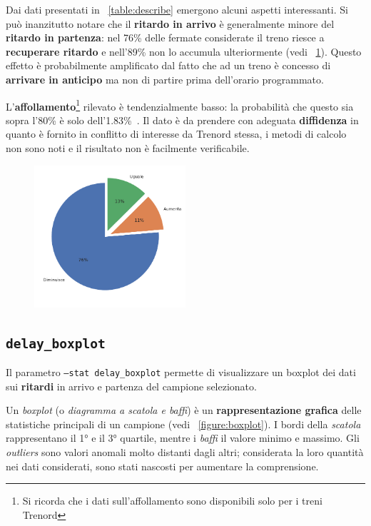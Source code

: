 \documentclass[12pt,italian]{report}
\begin{document}
Dai dati presentati in \tablename~\ref{table:describe} emergono alcuni
aspetti interessanti.  Si può inanzitutto notare che il
\textbf{ritardo in arrivo} è generalmente minore del \textbf{ritardo
    in partenza}: nel 76\% delle fermate considerate il treno riesce a
\textbf{recuperare ritardo} e nell'89\% non lo accumula ulteriormente
(vedi \figurename~\ref{figure:delay_var}).  Questo effetto è
probabilmente amplificato dal fatto che ad un treno è concesso di
\textbf{arrivare in anticipo} ma non di partire prima dell'orario
programmato.

L'\textbf{affollamento}\footnote{Si ricorda che i dati
    sull'affollamento sono disponibili solo per i treni Trenord}
rilevato è tendenzialmente basso: la probabilità che questo sia sopra
l'80\% è solo dell'1.83\%~\cite[B]{StatJup}.  Il dato è da prendere
con adeguata \textbf{diffidenza} in quanto è fornito in conflitto di
interesse da Trenord stessa, i metodi di calcolo non sono noti e il
risultato non è facilmente verificabile.

\begin{figure}[h] \centering
    \includegraphics[width=0.5\textwidth]{images/delay_var.pdf}
    \label{figure:delay_var}
\end{figure}

\subsection{\texttt{delay\_boxplot}}

Il parametro \texttt{--stat delay\_\-boxplot} permette di visualizzare
un boxplot dei dati sui \textbf{ritardi} in arrivo e partenza del
campione selezionato.

Un \textit{boxplot} (o \textit{diagramma a scatola e baffi}) è un
\textbf{rappresentazione grafica} delle statistiche principali di un
campione (vedi \figurename~\ref{figure:boxplot}).  I bordi della
\textit{scatola} rappresentano il 1° e il 3° quartile, mentre i
\textit{baffi} il valore minimo e massimo.  Gli \textit{outliers} sono
valori anomali molto distanti dagli altri; considerata la loro
quantità nei dati considerati, sono stati nascosti per aumentare la
comprensione.
\end{document}
